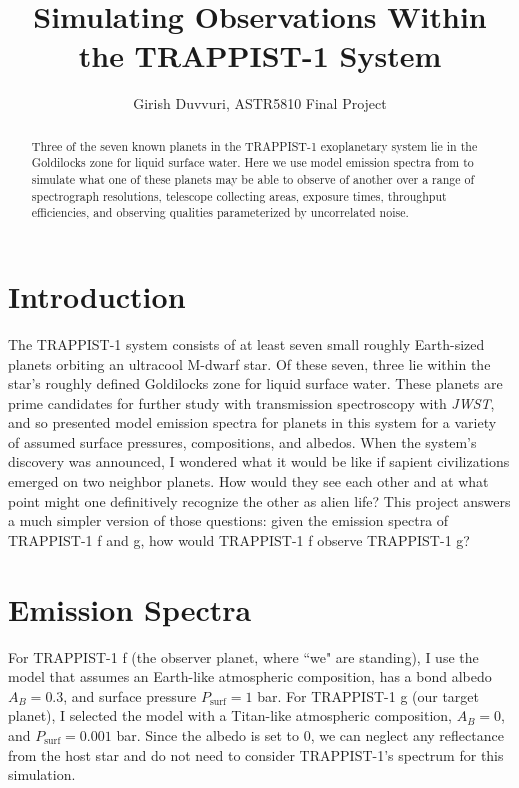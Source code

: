 \documentclass{knac}
\begin{document}
\title{Simulating Observations Within the TRAPPIST-1 System}


\author{Girish Duvvuri, ASTR5810 Final Project}

\begin{abstract}
    Three of the seven known planets in the TRAPPIST-1 exoplanetary system lie in the Goldilocks zone for liquid surface water. Here we use model emission spectra from \cite{Morley2017} to simulate what one of these planets may be able to observe of another over a range of spectrograph resolutions, telescope collecting areas, exposure times, throughput efficiencies, and observing qualities parameterized by uncorrelated noise.
\end{abstract}

\section{Introduction}

The TRAPPIST-1 system consists of at least seven small roughly Earth-sized planets orbiting an ultracool M-dwarf star. Of these seven, three lie within the star's roughly defined Goldilocks zone for liquid surface water. These planets are prime candidates for further study with transmission spectroscopy with \emph{JWST}, and so \cite{Morley2017} presented model emission spectra for planets in this system for a variety of assumed surface pressures, compositions, and albedos. When the system's discovery was announced, I wondered what it would be like if sapient civilizations emerged on two neighbor planets. How would they see each other and at what point might one definitively recognize the other as alien life? This project answers a much simpler version of those questions: given the emission spectra of TRAPPIST-1 f and g, how would TRAPPIST-1 f observe TRAPPIST-1 g?

\section{Emission Spectra}
For TRAPPIST-1 f (the observer planet, where ``we" are standing), I use the model that assumes an Earth-like atmospheric composition, has a bond albedo $A_B = 0.3$, and surface pressure $P_\mathrm{surf} = 1$ bar. For TRAPPIST-1 g (our target planet), I selected the model with a Titan-like atmospheric composition, $A_B = 0$, and $P_\mathrm{surf} = 0.001$ bar. Since the albedo is set to 0, we can neglect any reflectance from the host star and do not need to consider TRAPPIST-1's spectrum for this simulation.
\end{document}
